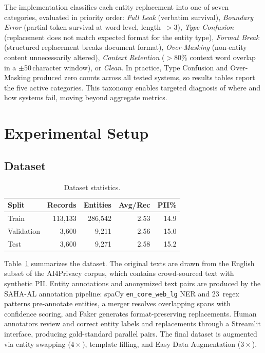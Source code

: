 \documentclass[10pt,twocolumn]{article}
\begin{document}
The implementation classifies each entity replacement into one of seven categories, evaluated in priority order: \emph{Full Leak} (verbatim survival), \emph{Boundary Error} (partial token survival at word level, length~$>3$), \emph{Type Confusion} (replacement does not match expected format for the entity type), \emph{Format Break} (structured replacement breaks document format), \emph{Over-Masking} (non-entity content unnecessarily altered), \emph{Context Retention} ($>$80\% context word overlap in a $\pm$50\,character window), or \emph{Clean}.
In practice, Type Confusion and Over-Masking produced zero counts across all tested systems, so results tables report the five active categories.
This taxonomy enables targeted diagnosis of where and how systems fail, moving beyond aggregate metrics.

\section{Experimental Setup}\label{sec:setup}

\subsection{Dataset}

\begin{table}[t]
\centering
\caption{Dataset statistics.}\label{tab:dataset}
\small
\begin{tabular}{@{}lrrrr@{}}
\toprule
Split & Records & Entities & Avg/Rec & PII\% \\
\midrule
Train & 113{,}133 & 286{,}542 & 2.53 & 14.9 \\
Validation & 3{,}600 & 9{,}211 & 2.56 & 15.0 \\
Test & 3{,}600 & 9{,}271 & 2.58 & 15.2 \\
\bottomrule
\end{tabular}
\end{table}

Table~\ref{tab:dataset} summarizes the dataset.
The original texts are drawn from the English subset of the AI4Privacy corpus, which contains crowd-sourced text with synthetic PII.
Entity annotations and anonymized text pairs are produced by the SAHA-AL annotation pipeline: spaCy \texttt{en\_core\_web\_lg} NER and 23~regex patterns pre-annotate entities, a merger resolves overlapping spans with confidence scoring, and Faker generates format-preserving replacements.
Human annotators review and correct entity labels and replacements through a Streamlit interface, producing gold-standard parallel pairs.
The final dataset is augmented via entity swapping ($4\times$), template filling, and Easy Data Augmentation ($3\times$).
\end{document}
